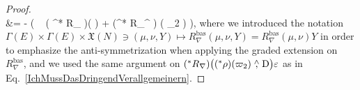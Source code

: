 \begin{proof}
\\
&=
- \mleft(
	 ~ \mleft(	{}^* R_{\nabla} \mright)\mleft(  \stackrel{\wedge}{,}  \mright) \varepsilon
	+ \mleft({}^* R_\nabla^{} \mright) \mleft(\varepsilon \stackrel{\wedge}{,} \varpi_2  \stackrel{\wedge}{,} \mright)
\mright),
\eas
where we introduced the notation $\Gamma(E) \times \Gamma(E) \times \mathfrak{X}(N) \ni (\mu, \nu, Y) \mapsto R_\nabla^{\mathrm{bas}}(\mu, \nu, Y) = R_\nabla^{\mathrm{bas}}(\mu, \nu) Y$ in order to emphasize the anti-symmetrization when applying the graded extension on $R_\nabla^{\mathrm{bas}}$, and we used the same argument on $\mleft( {}^* R_\nabla \mright) \bigl(\mleft({}^*\rho\mright)(\varpi_2) \stackrel{\wedge}{,} \mathrm{D}\bigr) \varepsilon$ as in Eq.~\eqref{IchMussDasDringendVerallgemeinern}.
\end{proof}

